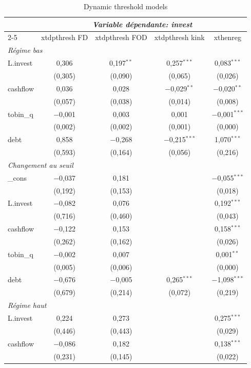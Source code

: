 \begin{table}[!htbp]
\centering
\caption{Dynamic threshold models}
\label{tab:dpt}
\begin{tabular}{lcccc}
\toprule
 & \multicolumn{4}{c}{\textit{Variable dépendante: invest}} \\
\cmidrule(lr){2-5}
 & xtdpthresh FD & xtdpthresh FOD & xtdpthresh kink & xthenreg \\
\midrule
\multicolumn{5}{l}{\textit{Régime bas}} \\
L.invest & 0,306 & 0,197$^{**}$ & 0,257$^{***}$ & 0,083$^{***}$ \\
 & (0,305) & (0,090) & (0,065) & (0,026) \\
cashflow & 0,036 & 0,028 & $-$0,029$^{**}$ & $-$0,020$^{**}$ \\
 & (0,057) & (0,038) & (0,014) & (0,008) \\
tobin\_q & $-$0,001 & 0,003 & 0,001 & $-$0,001$^{***}$ \\
 & (0,002) & (0,002) & (0,001) & (0,000) \\
debt & 0,858 & $-$0,268 & $-$0,215$^{***}$ & 1,070$^{***}$ \\
 & (0,593) & (0,164) & (0,056) & (0,216) \\
\multicolumn{5}{l}{\textit{Changement au seuil}} \\
\_cons & $-$0,037 & 0,181 &  & $-$0,055$^{***}$ \\
 & (0,192) & (0,153) &  & (0,018) \\
L.invest & $-$0,082 & 0,076 &  & 0,192$^{***}$ \\
 & (0,716) & (0,460) &  & (0,043) \\
cashflow & $-$0,122 & 0,153 &  & 0,158$^{***}$ \\
 & (0,262) & (0,162) &  & (0,026) \\
tobin\_q & $-$0,002 & 0,007 &  & 0,001$^{**}$ \\
 & (0,005) & (0,006) &  & (0,000) \\
debt & $-$0,676 & $-$0,005 & 0,265$^{***}$ & $-$1,098$^{***}$ \\
 & (0,679) & (0,214) & (0,072) & (0,219) \\
\multicolumn{5}{l}{\textit{Régime haut}} \\
L.invest & 0,224 & 0,273 &  & 0,275$^{***}$ \\
 & (0,446) & (0,443) &  & (0,029) \\
cashflow & $-$0,086 & 0,182 &  & 0,138$^{***}$ \\
 & (0,231) & (0,145) &  & (0,022) \\

\end{tabular}
\end{table}
